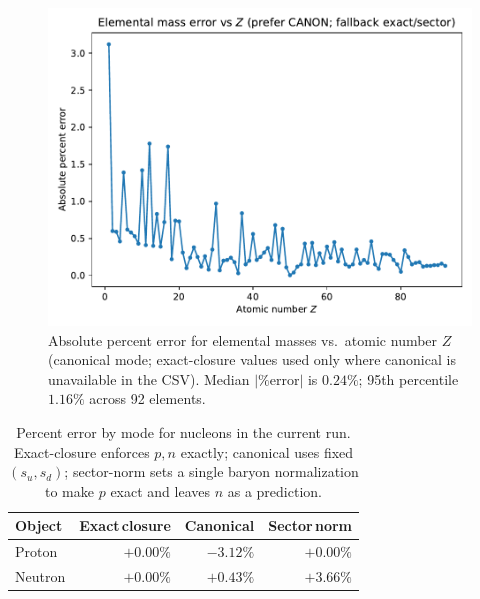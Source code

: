 \begin{figure}[t]
	\centering
	\includegraphics[width=0.75\linewidth]{elements_error_by_Z_canonical.pdf}
	\caption{Absolute percent error for elemental masses vs.\ atomic number \(Z\) (canonical mode; exact-closure values used only where canonical is unavailable in the CSV). Median \(|\%\text{error}|\) is \(0.24\%\); 95th percentile \(1.16\%\) across 92 elements.}
	\label{fig:elements_error_by_Z}
\end{figure}

\begin{table}[t]
	\centering
	\begin{tabular}{lrrr}
		\toprule
		\textbf{Object} & \textbf{Exact\,closure} & \textbf{Canonical} & \textbf{Sector\,norm} \\
		\midrule
		Proton  & \(+0.00\%\) & \(-3.12\%\) & \(+0.00\%\) \\
		Neutron & \(+0.00\%\) & \(+0.43\%\) & \(+3.66\%\) \\
		\bottomrule
	\end{tabular}
	\caption{Percent error by mode for nucleons in the current run. Exact-closure enforces \(p,n\) exactly; canonical uses fixed \((s_u,s_d)\); sector-norm sets a single baryon normalization to make \(p\) exact and leaves \(n\) as a prediction.}
	\label{tab:pn_modes}
\end{table}